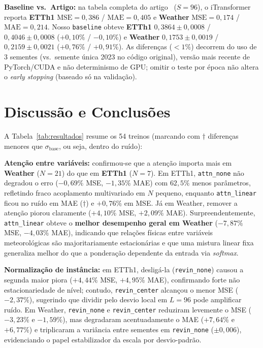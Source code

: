 \documentclass[conference]{IEEEtran}
\begin{document}
\textbf{Baseline vs.\ Artigo:} na tabela completa do artigo~\cite{liu2024itransformer} ($S{=}96$), o iTransformer reporta \textbf{ETTh1} $\text{MSE}{=}0{,}386$ / $\text{MAE}{=}0{,}405$ e \textbf{Weather} $\text{MSE}{=}0{,}174$ / $\text{MAE}{=}0{,}214$. Nosso \texttt{baseline} obteve \textbf{ETTh1} $0{,}3864{\pm}0{,}0008$ / $0{,}4046{\pm}0{,}0008$ ($+0{,}10\%$ / $-0{,}10\%$) e \textbf{Weather} $0{,}1753{\pm}0{,}0019$ / $0{,}2159{\pm}0{,}0021$ ($+0{,}76\%$ / $+0{,}91\%$). As diferenças ($<1\%$) decorrem do uso de 3 sementes (vs.\ semente única 2023 no código original), versão mais recente de PyTorch/CUDA e não determinismo de GPU; omitir o teste por época não altera o \emph{early stopping} (baseado só na validação).

\section{Discussão e Conclusões}
A Tabela~\ref{tab:resultados} resume os 54 treinos (marcando com $\dagger$ diferenças menores que $\sigma_{\text{base}}$, ou seja, dentro do ruído):

\textbf{Atenção entre variáveis:} confirmou-se que a atenção importa mais em \textbf{Weather} ($N{=}21$) do que em \textbf{ETTh1} ($N{=}7$). Em ETTh1, \texttt{attn\_none} não degradou o erro ($-0{,}69\%$ MSE, $-1{,}35\%$ MAE) com $62{,}5\%$ menos parâmetros, refletindo fraco acoplamento multivariado em $N$ pequeno, enquanto \texttt{attn\_linear} ficou no ruído em MAE ($\dagger$) e $+0{,}76\%$ em MSE. Já em Weather, remover a atenção piorou claramente ($+4{,}10\%$ MSE, $+2{,}09\%$ MAE). Surpreendentemente, \texttt{attn\_linear} obteve o \textbf{melhor desempenho geral em Weather} ($-7{,}87\%$ MSE, $-4{,}03\%$ MAE), indicando que relações físicas entre variáveis meteorológicas são majoritariamente estacionárias e que uma mistura linear fixa generaliza melhor do que a ponderação dependente da entrada via \emph{softmax}.

\textbf{Normalização de instância:} em ETTh1, desligá-la (\texttt{revin\_none}) causou a segunda maior piora ($+4{,}44\%$ MSE, $+4{,}95\%$ MAE), confirmando forte não estacionariedade de nível; contudo, \texttt{revin\_center} alcançou o menor MSE ($-2{,}37\%$), sugerindo que dividir pelo desvio local em $L{=}96$ pode amplificar ruído. Em Weather, \texttt{revin\_none} e \texttt{revin\_center} reduziram levemente o MSE ($-3{,}23\%$ e $-1{,}59\%$), mas degradaram acentuadamente o MAE ($+7{,}64\%$ e $+6{,}77\%$) e triplicaram a variância entre sementes em \texttt{revin\_none} ($\pm 0{,}006$), evidenciando o papel estabilizador da escala por desvio-padrão.
\end{document}
